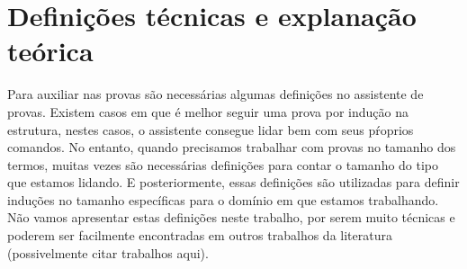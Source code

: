 \section{Definições técnicas e explanação teórica}



 Para auxiliar nas provas são necessárias algumas definições no assistente de provas. Existem casos em que é melhor
seguir uma prova por indução na estrutura, nestes casos, o assistente consegue lidar bem com seus pŕoprios comandos. No entanto,
quando precisamos trabalhar com provas no tamanho dos termos, muitas vezes são necessárias definições para contar o tamanho do
tipo que estamos lidando. E posteriormente, essas definições são utilizadas para definir induções no tamanho específicas para o 
domínio em que estamos trabalhando. Não vamos apresentar estas definições neste trabalho, por serem muito técnicas e poderem
ser facilmente encontradas em outros trabalhos da literatura (possivelmente citar trabalhos aqui). 

